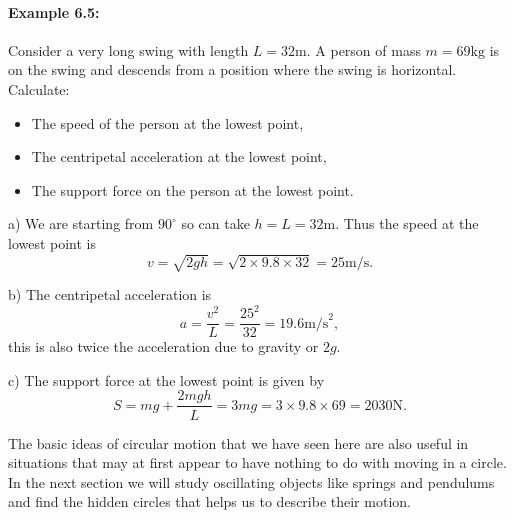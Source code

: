 \paragraph{Example 6.5:} Consider a very long swing with length $L=32\text{m}$. A person of mass $m=69\text{kg}$ is on the swing and descends from a position where the swing is horizontal. Calculate:
\begin{itemize}
\setlength{\itemsep}{-5pt}
    \item[a)] The speed of the person at the lowest point,
    \item[b)] The centripetal acceleration at the lowest point,
    \item[c)] The support force on the person at the lowest point.
\end{itemize} 

a) We are starting from $90^{\circ}$ so can take $h=L=32\text{m}$. Thus the speed at the lowest point is 
\begin{equation*}
v=\sqrt{2gh}=\sqrt{2\times 9.8\times 32}=25\text{m/s}.
\end{equation*}

b) The centripetal acceleration is 
\begin{equation*}
a=\frac{v^{2}}{L}=\frac{25^{2}}{32}=19.6\text{m/s}^{2},
\end{equation*}
this is also twice the acceleration due to gravity or $2g$.

c) The support force at the lowest point is given by 
\begin{equation*}
S=mg+\frac{2mgh}{L}=3mg=3\times 9.8\times 69=2030\text{N}.
\end{equation*}

The basic ideas of circular motion that we have seen here are also useful in situations that may at first appear to have nothing to do with moving in a circle. In the next section we will study oscillating objects like springs and pendulums and find the hidden circles that helps us to describe their motion.